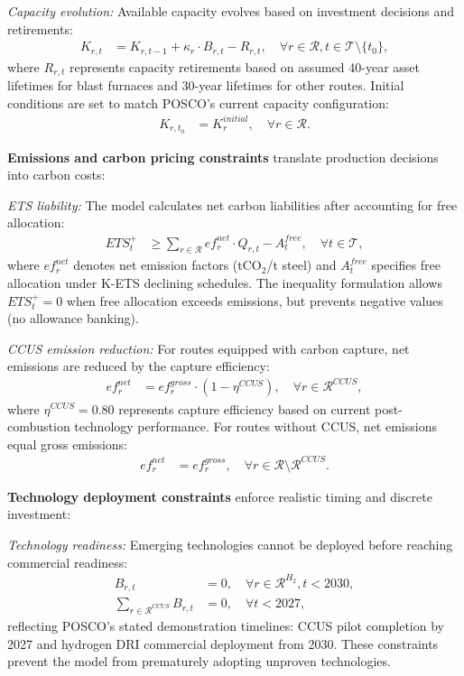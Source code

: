 \documentclass[preprint,1p,authoryear]{elsarticle}
\begin{document}
\textit{Capacity evolution:} Available capacity evolves based on investment decisions and retirements:
\begin{align}
K_{r,t} &= K_{r,t-1} + \kappa_r \cdot B_{r,t} - R_{r,t}, \quad \forall r \in \mathcal{R}, t \in \mathcal{T} \setminus \{t_0\}, \label{eq:capacity}
\end{align}
where $R_{r,t}$ represents capacity retirements based on assumed 40-year asset lifetimes for blast furnaces and 30-year lifetimes for other routes. Initial conditions are set to match POSCO's current capacity configuration:
\begin{align}
K_{r,t_0} &= K_r^{initial}, \quad \forall r \in \mathcal{R}. \label{eq:initial}
\end{align}

\textbf{Emissions and carbon pricing constraints} translate production decisions into carbon costs:

\textit{ETS liability:} The model calculates net carbon liabilities after accounting for free allocation:
\begin{align}
ETS_t^+ &\ge \sum_{r \in \mathcal{R}} ef_r^{net} \cdot Q_{r,t} - A_t^{free}, \quad \forall t \in \mathcal{T}, \label{eq:ets_balance}
\end{align}
where $ef_r^{net}$ denotes net emission factors (tCO$_2$/t steel) and $A_t^{free}$ specifies free allocation under K-ETS declining schedules. The inequality formulation allows $ETS_t^+ = 0$ when free allocation exceeds emissions, but prevents negative values (no allowance banking).

\textit{CCUS emission reduction:} For routes equipped with carbon capture, net emissions are reduced by the capture efficiency:
\begin{align}
ef_r^{net} &= ef_r^{gross} \cdot (1 - \eta^{CCUS}), \quad \forall r \in \mathcal{R}^{CCUS}, \label{eq:ccus_factor}
\end{align}
where $\eta^{CCUS} = 0.80$ represents capture efficiency based on current post-combustion technology performance. For routes without CCUS, net emissions equal gross emissions:
\begin{align}
ef_r^{net} &= ef_r^{gross}, \quad \forall r \in \mathcal{R} \setminus \mathcal{R}^{CCUS}. \label{eq:no_ccus}
\end{align}

\textbf{Technology deployment constraints} enforce realistic timing and discrete investment:

\textit{Technology readiness:} Emerging technologies cannot be deployed before reaching commercial readiness:
\begin{align}
B_{r,t} &= 0, \quad \forall r \in \mathcal{R}^{H_2}, t < 2030, \label{eq:h2_timing}\\
\sum_{r \in \mathcal{R}^{CCUS}} B_{r,t} &= 0, \quad \forall t < 2027, \label{eq:ccus_timing}
\end{align}
reflecting POSCO's stated demonstration timelines: CCUS pilot completion by 2027 and hydrogen DRI commercial deployment from 2030. These constraints prevent the model from prematurely adopting unproven technologies.
\end{document}

